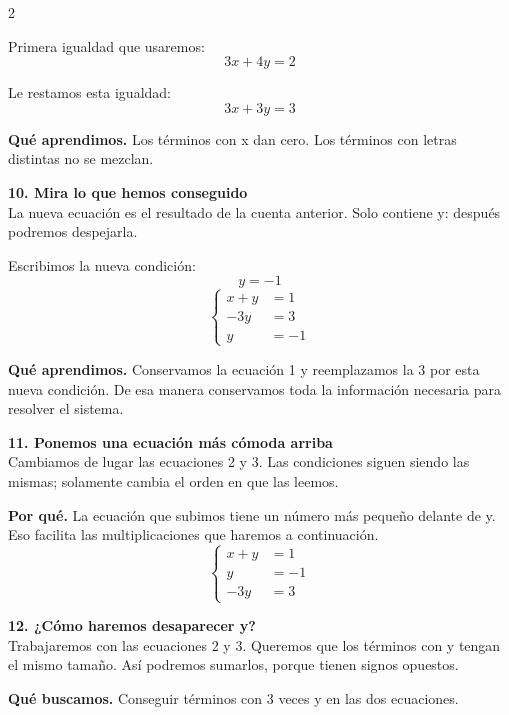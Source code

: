 \documentclass[11pt,a4paper,landscape]{article}
\begin{document}
\begin{multicols*}{2}
\begin{minipage}{\linewidth}
\par\smallskip Primera igualdad que usaremos:
\[3x + 4y = 2\]
\par\smallskip Le restamos esta igualdad:
\[3x + 3y = 3\]
\par\smallskip\textbf{Qué aprendimos.} Los términos con x dan cero. Los términos con letras distintas no se mezclan.
\end{minipage}\par\medskip
\noindent\begin{minipage}{\linewidth}\textbf{10. Mira lo que hemos conseguido}\\[2pt]La nueva ecuación es el resultado de la cuenta anterior. Solo contiene y: después podremos despejarla.
\par\smallskip Escribimos la nueva condición:
\[y = -1\]
\[\left\{\begin{aligned}x + y &= 1\\-3y &= 3\\y &= -1\end{aligned}\right.\]
\par\smallskip\textbf{Qué aprendimos.} Conservamos la ecuación 1 y reemplazamos la 3 por esta nueva condición. De esa manera conservamos toda la información necesaria para resolver el sistema.
\end{minipage}\par\medskip
\noindent\begin{minipage}{\linewidth}\textbf{11. Ponemos una ecuación más cómoda arriba}\\[2pt]Cambiamos de lugar las ecuaciones 2 y 3. Las condiciones siguen siendo las mismas; solamente cambia el orden en que las leemos.
\par\smallskip\textbf{Por qué.} La ecuación que subimos tiene un número más pequeño delante de y. Eso facilita las multiplicaciones que haremos a continuación.
\[\left\{\begin{aligned}x + y &= 1\\y &= -1\\-3y &= 3\end{aligned}\right.\]
\end{minipage}\par\medskip
\noindent\begin{minipage}{\linewidth}\textbf{12. ¿Cómo haremos desaparecer y?}\\[2pt]Trabajaremos con las ecuaciones 2 y 3. Queremos que los términos con y tengan el mismo tamaño. Así podremos sumarlos, porque tienen signos opuestos.
\par\smallskip\textbf{Qué buscamos.} Conseguir términos con 3 veces y en las dos ecuaciones.

\end{minipage}
\end{multicols*}
\end{document}
